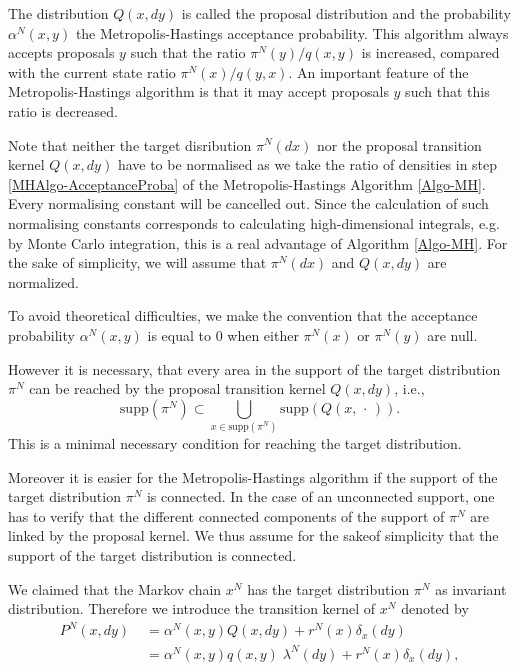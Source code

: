 The distribution $ Q(x,dy) $ is called the proposal distribution and the probability $ \alpha^{N}(x,y) $ the Metropolis-Hastings acceptance probability. This algorithm always accepts proposals $y$ such that the ratio $ \pi^{N}(y) / q(x,y) $ is increased, compared with the current state ratio $ \pi^{N}(x) / q(y,x) $. An important feature of the Metropolis-Hastings algorithm is that it may accept proposals $y$ such that this ratio is decreased.

\begin{rem}
\label{Rem-Omitting constants in densities}
 Note that neither the target disribution $ \pi^{N}(dx) $ nor the proposal transition kernel $ Q(x,dy) $ have to be normalised as we take the ratio of densities in step \ref{MHAlgo-AcceptanceProba} of the Metropolis-Hastings Algorithm \ref{Algo-MH}. Every normalising constant will be cancelled out. Since the calculation of such normalising constants corresponds to calculating high-dimensional integrals, e.g. by Monte Carlo integration, this is a real advantage of Algorithm \ref{Algo-MH}. For the sake of simplicity, we will assume that $ \pi^{N}(dx) $ and $ Q(x,dy) $ are normalized.
\end{rem}

To avoid theoretical difficulties, we make the convention that the acceptance probability $ \alpha^{N}(x,y) $ is equal to 0 when either $ \pi^{N}(x) $ or $ \pi^{N}(y) $ are null.

\begin{rem}
\label{Rem-SupportOfProposals}
However it is necessary, that every area in the support of the target distribution $ \pi^{N} $ can be reached by the proposal transition kernel $ Q(x,dy) $, i.e.,
\begin{equation*}
 \text{supp} (\pi^{N}) \subset \bigcup_{x \in \text{supp} (\pi^{N}) } \text{supp} (Q(x, \, \cdot \,)).
\end{equation*}
This is a minimal necessary condition for reaching the target distribution.

Moreover it is easier for the Metropolis-Hastings algorithm if the support of the target distribution $ \pi^{N} $ is connected. In the case of an unconnected support, one has to verify that the different connected components of the support of $ \pi^{N} $ are linked by the proposal kernel. We thus assume for the sakeof simplicity that the support of the target distribution is connected.
 
\end{rem}


We claimed that the Markov chain $ x^{N} $ has the target distribution $ \pi^{N} $ as invariant distribution. Therefore we introduce the transition kernel of $ x^{N} $ denoted by
\begin{align}
\label{MH-TransitionKernelOfMHChain}
 P^{N}(x,dy) & \; = \alpha^{N}(x,y) Q(x, dy) + r^{N}(x)\delta_{x}(dy) \\
 & \; = \alpha^{N}(x,y) q(x,y) \; \lambda^{N}(dy) + r^{N}(x)\delta_{x}(dy),
\end{align}

